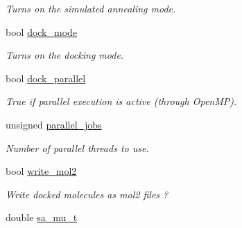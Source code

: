 \begin{DoxyCompactItemize}
\begin{DoxyCompactList}\small\item\em Turns on the simulated annealing mode. \item\end{DoxyCompactList}\item 
\hypertarget{classPARSER_a207f9e04decc8ce256080622f4d9e32f}{
bool \hyperlink{classPARSER_a207f9e04decc8ce256080622f4d9e32f}{dock\_\-mode}}
\label{classPARSER_a207f9e04decc8ce256080622f4d9e32f}

\begin{DoxyCompactList}\small\item\em Turns on the docking mode. \item\end{DoxyCompactList}\item 
\hypertarget{classPARSER_a0929e1c79b6128cb26ff6331fb781ef4}{
bool \hyperlink{classPARSER_a0929e1c79b6128cb26ff6331fb781ef4}{dock\_\-parallel}}
\label{classPARSER_a0929e1c79b6128cb26ff6331fb781ef4}

\begin{DoxyCompactList}\small\item\em True if parallel execution is active (through OpenMP). \item\end{DoxyCompactList}\item 
\hypertarget{classPARSER_afc1b3754847018dd41cace6aaa64d220}{
unsigned \hyperlink{classPARSER_afc1b3754847018dd41cace6aaa64d220}{parallel\_\-jobs}}
\label{classPARSER_afc1b3754847018dd41cace6aaa64d220}

\begin{DoxyCompactList}\small\item\em Number of parallel threads to use. \item\end{DoxyCompactList}\item 
\hypertarget{classPARSER_a76e724537f471d32948206061b0a04c4}{
bool \hyperlink{classPARSER_a76e724537f471d32948206061b0a04c4}{write\_\-mol2}}
\label{classPARSER_a76e724537f471d32948206061b0a04c4}

\begin{DoxyCompactList}\small\item\em Write docked molecules as mol2 files ? \item\end{DoxyCompactList}\item 
\hypertarget{classPARSER_a1355dce4f39c9fd9a52be2ba7ee962f4}{
double \hyperlink{classPARSER_a1355dce4f39c9fd9a52be2ba7ee962f4}{sa\_\-mu\_\-t}}
\label{classPARSER_a1355dce4f39c9fd9a52be2ba7ee962f4}


\end{DoxyCompactItemize}
